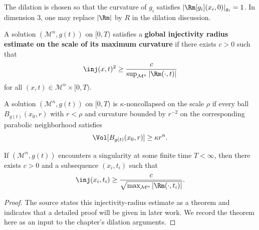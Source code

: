 \begin{remark}
\label{ch08-rem-dilation-normalization}
The dilation is chosen so that the curvature of \(g_i\) satisfies \(|\Rm[g_i](x_i,0)|_{g_i}=1\). In dimension \(3\), one may replace \(|\Rm|\) by \(R\) in the dilation discussion.
\end{remark}

\begin{definition}
\label{ch08-def-global-injectivity-radius-estimate}
A solution \((\mathcal M^n,g(t))\) on \([0,T)\) satisfies a \textbf{global injectivity radius estimate on the scale of its maximum curvature} if there exists \(c>0\) such that
\[
\inj(x,t)^2\ge \frac{c}{\sup_{\mathcal M^n}|\Rm(\cdot,t)|}
\]
for all \((x,t)\in\mathcal M^n\times[0,T)\).
\end{definition}

\begin{definition}
\label{ch08-def-kappa-noncollapsed}
A solution \((\mathcal M^n,g(t))\) on \([0,T)\) is \(\kappa\)-noncollapsed on the scale \(\rho\) if every ball \(B_{g(t)}(x_0,r)\) with \(r<\rho\) and curvature bounded by \(r^{-2}\) on the corresponding parabolic neighborhood satisfies
\[
\Vol[B_{g(t)}(x_0,r)]\ge \kappa r^n.
\]
\end{definition}

\begin{theorem}
\label{ch08-thm-perelman-injectivity-estimate}
If \((\mathcal M^n,g(t))\) encounters a singularity at some finite time \(T<\infty\), then there exists \(c>0\) and a subsequence \((x_i,t_i)\) such that
\[
\inj(x_i,t_i)\ge \frac{c}{\sqrt{\max_{\mathcal M^n}|\Rm(\cdot,t_i)|}}.
\]
\end{theorem}

\begin{proof}
\sketch The source states this injectivity-radius estimate as a theorem and indicates that a detailed proof will be given in later work. We record the theorem here as an input to the chapter's dilation arguments.
\end{proof}

